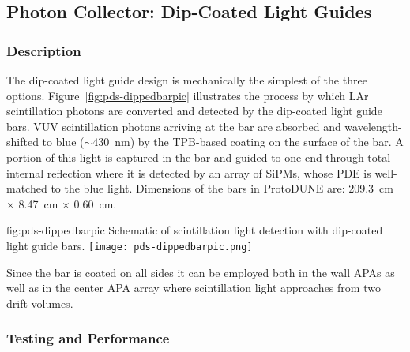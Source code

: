 
\subsection{Photon Collector: Dip-Coated Light Guides}
\label{ssec:fdsp-pd-pc-bar1}

\subsubsection{Description}

The dip-coated light guide design is mechanically the simplest of the three options. Figure~\ref{fig:pds-dippedbarpic} illustrates the process by which LAr scintillation photons are converted and detected by the dip-coated light guide bars.  VUV scintillation photons arriving at the bar are absorbed and wavelength-shifted to blue ($\sim430$~nm) by the TPB-based coating on the surface of the bar.  A portion of this light is captured in the bar and guided to one end through total internal reflection where it is detected by an array of SiPMs, whose PDE is well-matched to the blue light.  Dimensions of the bars in ProtoDUNE are: \SI{209.3}{cm} $\times$ \SI{8.47}{cm} $\times$ \SI{0.60}{cm}.

\begin{dunefigure}{fig:pds-dippedbarpic}
{Schematic of scintillation light detection with dip-coated light guide bars.}
  \texttt{[image: pds-dippedbarpic.png]}
\end{dunefigure}

Since the bar is coated on all sides it can be employed both in the wall APAs as well as in the center APA array where scintillation light approaches from two drift volumes.


\subsubsection{Testing and Performance}

